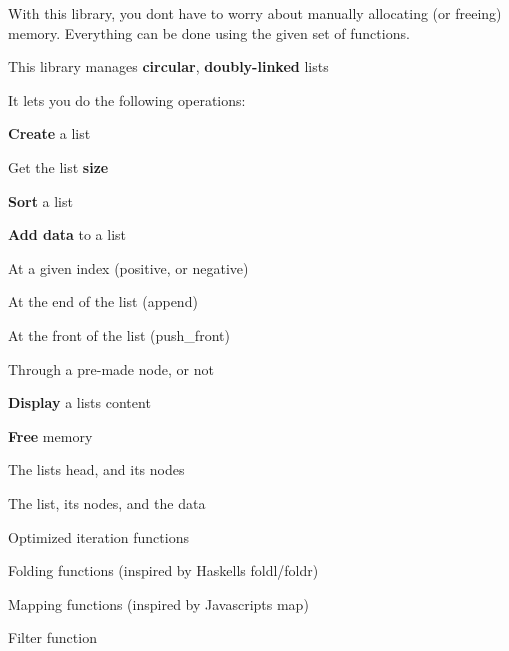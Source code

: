 \href{https://github.com/Arthi-chaud/LinkedLists/actions/workflows/build.yml}{\tt } \href{https://github.com/Arthi-chaud/LinkedLists/actions/workflows/coding_style.yml}{\tt } \href{https://github.com/Arthi-chaud/LinkedLists/actions/workflows/unit_tests.yml}{\tt }





With this library, you don\textquotesingle{}t have to worry about manually allocating (or freeing) memory. Everything can be done using the given set of functions.

This library manages {\bfseries circular}, {\bfseries doubly-\/linked} lists

It lets you do the following operations\+:


\begin{DoxyItemize}
\item {\bfseries Create} a list
\item Get the list {\bfseries size}
\item {\bfseries Sort} a list
\item {\bfseries Add data} to a list
\begin{DoxyItemize}
\item At a given index (positive, or negative)
\item At the end of the list (append)
\item At the front of the list (push\+\_\+front)
\item Through a pre-\/made node, or not
\end{DoxyItemize}
\item {\bfseries Display} a list\textquotesingle{}s content
\item {\bfseries Free} memory
\begin{DoxyItemize}
\item The list\textquotesingle{}s head, and its nodes
\item The list, its nodes, and the data
\end{DoxyItemize}
\item Optimized iteration functions
\begin{DoxyItemize}
\item Folding functions (inspired by Haskell\textquotesingle{}s foldl/foldr)
\item Mapping functions (inspired by Javascript\textquotesingle{}s map)
\item Filter function
\end{DoxyItemize}
\end{DoxyItemize}

